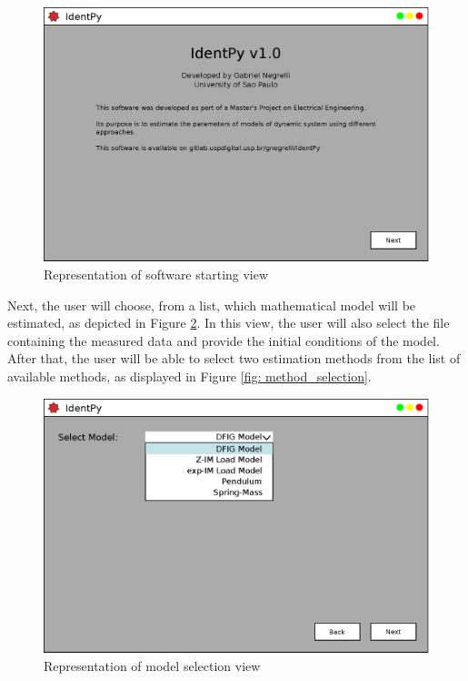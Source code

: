 \begin{figure}[h]
	\caption{Representation of software starting view}
	\begin{center}
		\includegraphics[scale=.5]{Images/Software_init_pg.eps}
	\end{center}
	\label{fig: initial_page}
\end{figure}

Next, the user will choose, from a list, which mathematical model will be estimated, as depicted in Figure \ref{fig: model_selection}. In this view, the user will also select the file containing the measured data and provide the initial conditions of the model. After that, the user will be able to select two estimation methods from the list of available methods, as displayed in Figure \ref{fig: method_selection}.

\begin{figure}[h]
	\caption{Representation of model selection view}
	\begin{center}
		\includegraphics[scale=.5]{Images/Software_pg1.eps}
	\end{center}
	\label{fig: model_selection}
\end{figure}


